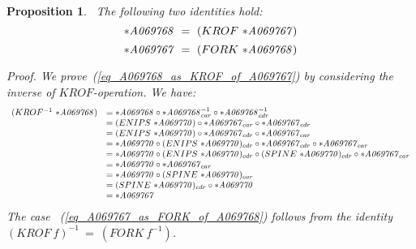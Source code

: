 \documentclass[11pt]{article} %
\newtheorem{propo}{Proposition}
\newcommand{\eqn}[1]{(\ref{#1})}
\newcommand{\eeq}{\end{equation}}
\newcommand{\beql}[1]{\begin{equation}\label{#1}}
\newcommand{\autname}[1]{{\it *#1}}
\newcommand{\funapply}{\ensuremath{\circ}}
\begin{document}
\begin{propo}~\label{propo_A069768_as_KROF_of_A069767}
\normalfont
The following two identities hold:
\beql{eq_A069768_as_KROF_of_A069767}
\autname{A069768}~=~(KROF~\autname{A069767})
\eeq
\beql{eq_A069767_as_FORK_of_A069768}
\autname{A069767}~=~(FORK~\autname{A069768})
\eeq

\textit{Proof}.
We prove~\eqn{eq_A069768_as_KROF_of_A069767} by considering the inverse
of $KROF$-operation. We have:
\beql{proof_of_A069768_as_KROF_of_A069767}
\begin{array}{l l}
(KROF^{-1}~\autname{A069768}) & = \autname{A069768} \funapply \autname{A069768}^{-1}_{car} \funapply \autname{A069768}^{-1}_{cdr} \\
     & = (ENIPS~\autname{A069770}) \funapply \autname{A069767}_{car} \funapply \autname{A069767}_{cdr} \\
     & = (ENIPS~\autname{A069770}) \funapply \autname{A069767}_{cdr} \funapply \autname{A069767}_{car} \\
     & = \autname{A069770} \funapply (ENIPS~\autname{A069770})_{cdr} \funapply \autname{A069767}_{cdr} \funapply \autname{A069767}_{car} \\
     & = \autname{A069770} \funapply (ENIPS~\autname{A069770})_{cdr} \funapply (SPINE~\autname{A069770})_{cdr} \funapply \autname{A069767}_{car} \\
     & = \autname{A069770} \funapply \autname{A069767}_{car} \\
     & = \autname{A069770} \funapply (SPINE~\autname{A069770})_{car} \\
     & = (SPINE~\autname{A069770})_{cdr} \funapply \autname{A069770} \\
     & = \autname{A069767} \\
\end{array}
\eeq
The case ~\eqn{eq_A069767_as_FORK_of_A069768} follows from the identity
$(KROF~f)^{-1}~=~(FORK~f^{-1})$.
\end{propo}
\end{document}
